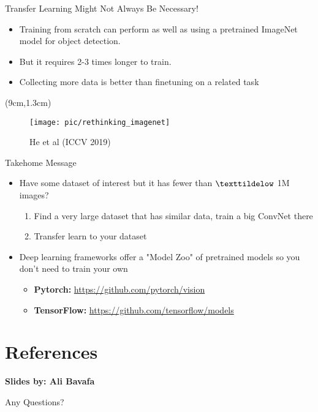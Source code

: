 \documentclass[serif, aspectratio=169]{beamer}
\begin{document}
\begin{frame}{Transfer Learning Might Not Always Be Necessary!}
	\begin{itemize}
		\item Training from scratch can perform as well \newline as using a pretrained ImageNet model for \newline object detection.
		\item But it requires 2-3 times longer to train.
		\item Collecting more data is better than \newline finetuning on a related task
	\end{itemize}
	\begin{textblock*}{5cm}(9cm,1.3cm) %
		\begin{figure}
			\texttt{[image: pic/rethinking\_imagenet]}
			\caption*{\hspace{2cm}\scriptsize He et al (ICCV 2019)}
		\end{figure}
	\end{textblock*}
\end{frame}

\begin{frame}{Takehome Message}
	\begin{itemize}
		\item Have some dataset of interest but it has fewer than $\texttildelow$ 1M images?
		\begin{enumerate}
			\item Find a very large dataset that has similar data, train a big ConvNet there
			\item Transfer learn to your dataset
		\end{enumerate}
		\item Deep learning frameworks offer a "Model Zoo" of pretrained models so you don't need to train your own
		\begin{itemize}
			\item \textbf{Pytorch:} \href{https://github.com/pytorch/vision}{\color{blue} https://github.com/pytorch/vision}
			\item \textbf{TensorFlow:} \href{https://github.com/tensorflow/models}{\color{blue} https://github.com/tensorflow/models}
		\end{itemize}

	\end{itemize}
\end{frame}

\section{References}

\begin{frame}
	\textbf{Slides by: Ali Bavafa}
\end{frame}

\begin{frame}
	\nocite{*}
	
	
\end{frame}


\begin{frame}
	\begin{center}
		{\Huge Any Questions?}
	\end{center}
\end{frame}
\end{document}
